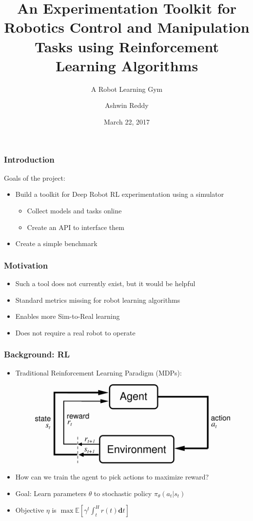 \documentclass[12pt,handout]{beamer}
\title{An Experimentation Toolkit for Robotics Control and Manipulation Tasks using Reinforcement Learning Algorithms}
\subtitle{A Robot Learning Gym}
\author{Ashwin Reddy\inst{1}}
\institute
{
\inst{1}%
The Harker School
}
\date %
{March 22, 2017}
\begin{document}
\frame{\titlepage}
\begin{frame}
    \frametitle{Introduction}
    Goals of the project:
    \begin{itemize}
        \item{Build a toolkit for Deep Robot RL experimentation using a simulator}
        \begin{itemize}
            \item{Collect models and tasks online}
            \item{Create an API to interface them}
        \end{itemize}
        \item{Create a simple benchmark}
    \end{itemize}
\end{frame}
\begin{frame}
    \frametitle{Motivation}
    \begin{itemize}
        \item{Such a tool does not currently exist, but it would be helpful}
        \item{Standard metrics missing for robot learning algorithms}
        \item{Enables more Sim-to-Real learning}
        \item{Does not require a real robot to operate}
    \end{itemize}
\end{frame}
\begin{frame}
    \frametitle{Background: RL}
    \begin{itemize}
        \item{
        Traditional Reinforcement Learning Paradigm (MDPs):
        \begin{figure}[p]
            \includegraphics[scale=0.25]{diagram1}
        \end{figure}
        }
        \item{How can we train the agent to pick actions to maximize reward?}
        \item{Goal: Learn parameters $\theta$ to stochastic policy $\pi_\theta(a_t|s_t)$}
        \item{Objective $\eta$ is $\max{\mathbb{E}\left[  \gamma^t  \int_t^H{r(t)\mathbf{d}t}  \right]}$}
    \end{itemize}
\end{frame}
\end{document}

